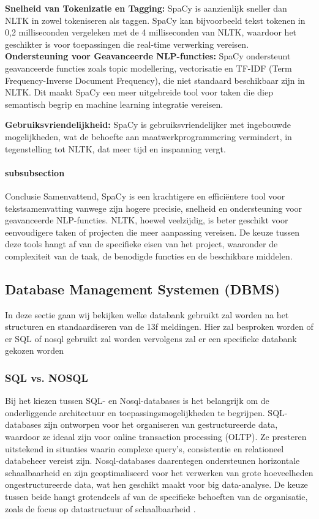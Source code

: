 \textbf{Snelheid van Tokenizatie en Tagging:} SpaCy is aanzienlijk sneller dan NLTK in zowel tokeniseren als taggen. SpaCy kan bijvoorbeeld tekst tokenen in 0,2 milliseconden vergeleken met de 4 milliseconden van NLTK, waardoor het geschikter is voor toepassingen die real-time verwerking vereisen.
\textbf{Ondersteuning voor Geavanceerde NLP-functies:} SpaCy ondersteunt geavanceerde functies zoals topic modellering, vectorisatie en TF-IDF (Term Frequency-Inverse Document Frequency), die niet standaard beschikbaar zijn in NLTK. Dit maakt SpaCy een meer uitgebreide tool voor taken die diep semantisch begrip en machine learning integratie vereisen.

\textbf{Gebruiksvriendelijkheid:} SpaCy is gebruiksvriendelijker met ingebouwde mogelijkheden, wat de behoefte aan maatwerkprogrammering vermindert, in tegenstelling tot NLTK, dat meer tijd en inspanning vergt.

\paragraph{subsubsection}{Conclusie}
Samenvattend, SpaCy is een krachtigere en efficiëntere tool voor tekstsamenvatting vanwege zijn hogere precisie, snelheid en ondersteuning voor geavanceerde NLP-functies. NLTK, hoewel veelzijdig, is beter geschikt voor eenvoudigere taken of projecten die meer aanpassing vereisen. De keuze tussen deze tools hangt af van de specifieke eisen van het project, waaronder de complexiteit van de taak, de benodigde functies en de beschikbare middelen.


\subsection{Database Management Systemen (DBMS)}
In deze sectie gaan wij bekijken welke databank gebruikt zal worden na het structuren en standaardiseren van de 13f meldingen. Hier zal besproken worden of er SQL of nosql gebruikt zal worden vervolgens zal er een specifieke databank gekozen worden
\subsubsection{SQL vs. NOSQL}
Bij het kiezen tussen SQL- en Nosql-databases is het belangrijk om de onderliggende architectuur en toepassingsmogelijkheden te begrijpen. SQL-databases zijn ontworpen voor het organiseren van gestructureerde data, waardoor ze ideaal zijn voor online transaction processing (OLTP). Ze presteren uitstekend in situaties waarin complexe query’s, consistentie en relationeel databeheer vereist zijn. Nosql-databases daarentegen ondersteunen horizontale schaalbaarheid en zijn geoptimaliseerd voor het verwerken van grote hoeveelheden ongestructureerde data, wat hen geschikt maakt voor big data-analyse. De keuze tussen beide hangt grotendeels af van de specifieke behoeften van de organisatie, zoals de focus op datastructuur of schaalbaarheid \autocite{khan2023performance}.

